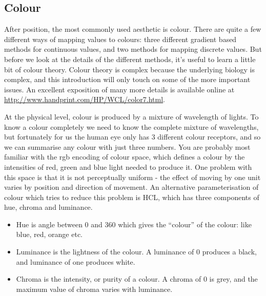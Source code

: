 
\subsection{Colour}
\label{sub:scale-colour}

After position, the most commonly used aesthetic is colour.  There are quite a few different ways of mapping values to colours: three different gradient based methods for continuous values, and two methods for mapping discrete values.  But before we look at the details of the different methods, it's useful to learn a little bit of colour theory.  Colour theory is complex because the underlying biology is complex, and this introduction will only touch on some of the more important issues.  An excellent exposition of many more details is available online at \url{http://www.handprint.com/HP/WCL/color7.html}.

At the physical level, colour is produced by a mixture of wavelength of lights.  To know a colour completely we need to know the complete mixture of wavelengths, but fortunately for us the human eye only has 3 different colour receptors, and so we can summarise any colour with just three numbers.  You are probably most familiar with the rgb encoding of colour space, which defines a colour by the intensities of red, green and blue light needed to produce it.  One problem with this space is that it is not perceptually uniform - the effect of moving by one unit varies by position and direction of movement.  An alternative parameterisation of colour which tries to reduce this problem is HCL, which has three components of hue, chroma and luminance.

\begin{itemize}
  \item Hue is angle between 0 and 360 which gives the ``colour'' of the colour: like blue, red, orange etc.  
  \item Luminance is the lightness of the colour.  A luminance of 0 produces a black, and luminance of one produces white.
  \item Chroma is the intensity, or purity of a colour.  A chroma of 0 is grey, and the maximum value of chroma varies with luminance.
\end{itemize} 

